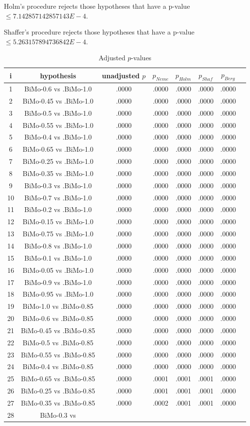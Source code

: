 \documentclass[a4paper,10pt]{article}
\begin{document}
\begin{landscape}
Holm's procedure rejects those hypotheses that have a p-value $\le7.142857142857143E-4$.


Shaffer's procedure rejects those hypotheses that have a p-value $\le5.263157894736842E-4$.


\begin{table}[!htp]
\centering\tiny
\caption{Adjusted $p$-values}
\begin{tabular}{cccccccc}
i&hypothesis&unadjusted $p$&$p_{Neme}$&$p_{Holm}$&$p_{Shaf}$&$p_{Berg}$\\
\hline
1&BiMo-0.6 vs .BiMo-1.0&.0000&.0000&.0000&.0000&.0000\\2&BiMo-0.45 vs .BiMo-1.0&.0000&.0000&.0000&.0000&.0000\\3&BiMo-0.5 vs .BiMo-1.0&.0000&.0000&.0000&.0000&.0000\\4&BiMo-0.55 vs .BiMo-1.0&.0000&.0000&.0000&.0000&.0000\\5&BiMo-0.4 vs .BiMo-1.0&.0000&.0000&.0000&.0000&.0000\\6&BiMo-0.65 vs .BiMo-1.0&.0000&.0000&.0000&.0000&.0000\\7&BiMo-0.25 vs .BiMo-1.0&.0000&.0000&.0000&.0000&.0000\\8&BiMo-0.35 vs .BiMo-1.0&.0000&.0000&.0000&.0000&.0000\\9&BiMo-0.3 vs .BiMo-1.0&.0000&.0000&.0000&.0000&.0000\\10&BiMo-0.7 vs .BiMo-1.0&.0000&.0000&.0000&.0000&.0000\\11&BiMo-0.2 vs .BiMo-1.0&.0000&.0000&.0000&.0000&.0000\\12&BiMo-0.15 vs .BiMo-1.0&.0000&.0000&.0000&.0000&.0000\\13&BiMo-0.75 vs .BiMo-1.0&.0000&.0000&.0000&.0000&.0000\\14&BiMo-0.8 vs .BiMo-1.0&.0000&.0000&.0000&.0000&.0000\\15&BiMo-0.1 vs .BiMo-1.0&.0000&.0000&.0000&.0000&.0000\\16&BiMo-0.05 vs .BiMo-1.0&.0000&.0000&.0000&.0000&.0000\\17&BiMo-0.9 vs .BiMo-1.0&.0000&.0000&.0000&.0000&.0000\\18&BiMo-0.95 vs .BiMo-1.0&.0000&.0000&.0000&.0000&.0000\\19&BiMo-1.0 vs .BiMo-0.85&.0000&.0000&.0000&.0000&.0000\\20&BiMo-0.6 vs .BiMo-0.85&.0000&.0000&.0000&.0000&.0000\\21&BiMo-0.45 vs .BiMo-0.85&.0000&.0000&.0000&.0000&.0000\\22&BiMo-0.5 vs .BiMo-0.85&.0000&.0000&.0000&.0000&.0000\\23&BiMo-0.55 vs .BiMo-0.85&.0000&.0000&.0000&.0000&.0000\\24&BiMo-0.4 vs .BiMo-0.85&.0000&.0000&.0000&.0000&.0000\\25&BiMo-0.65 vs .BiMo-0.85&.0000&.0001&.0001&.0001&.0000\\26&BiMo-0.25 vs .BiMo-0.85&.0000&.0001&.0001&.0001&.0000\\27&BiMo-0.35 vs .BiMo-0.85&.0000&.0002&.0001&.0001&.0000\\28&BiMo-0.3 vs 
\end{tabular}
\end{table}
\end{landscape}
\end{document}
